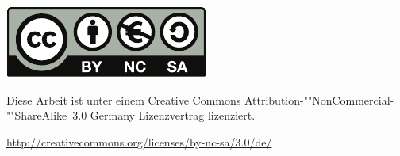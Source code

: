 \makeatletter
\if@openright\cleardoublepage\else\clearpage\fi 
\makeatother%
\vspace*{\fill}

\begin{center}
\includegraphics[width=0.3\linewidth,keepaspectratio]{bilder/cc_by-nc-sa_eu}

Diese Arbeit ist unter einem Creative Commons Attribution-""NonCommercial-""ShareAlike~3.0 Germany Lizenzvertrag lizenziert.

\url{http://creativecommons.org/licenses/by-nc-sa/3.0/de/}
\end{center}

\vspace*{\fill}

